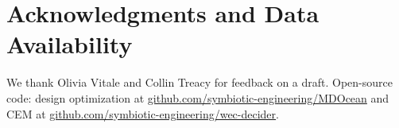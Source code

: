 

\section*{Acknowledgments and Data Availability}
We thank Olivia Vitale and Collin Treacy for feedback on a draft.
Open-source code: design optimization at \url{github.com/symbiotic-engineering/MDOcean} and CEM at \url{github.com/symbiotic-engineering/wec-decider}.

\clearpage




